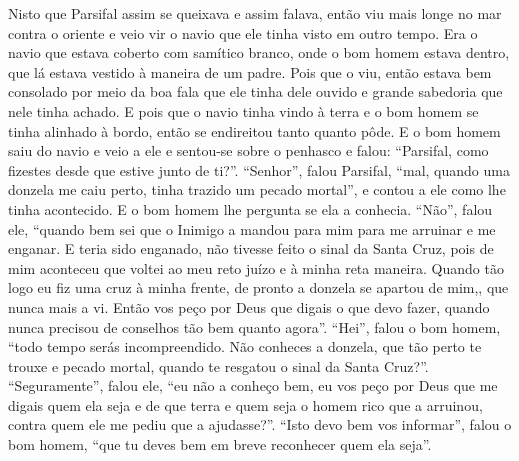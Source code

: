 Nisto que Parsifal assim se queixava e assim falava, então viu mais longe
no mar contra o oriente e veio vir o navio que ele tinha visto em outro tempo.
Era o navio que estava coberto com samítico branco, onde o bom homem estava
dentro, que lá estava vestido à maneira de um padre. Pois que o viu, então
estava bem consolado por meio da boa fala que ele tinha dele ouvido e grande
sabedoria que nele tinha achado. E pois que o navio tinha vindo à terra e o bom
homem se tinha alinhado à bordo, então se endireitou tanto quanto pôde. E o bom
homem saiu do navio e veio a ele e sentou-se sobre o penhasco e falou:
“Parsifal, como fizestes desde que estive junto de ti?”. “Senhor”, falou
Parsifal, “mal, quando uma donzela me caiu perto, tinha trazido um pecado
mortal”, e contou a ele como lhe tinha acontecido. E o bom homem lhe pergunta
se ela a conhecia. “Não”, falou ele, “quando bem sei que o Inimigo a mandou
para mim para me arruinar e me enganar. E teria sido enganado, não tivesse
feito o sinal da Santa Cruz, pois de mim aconteceu que voltei ao meu reto juízo
e à minha reta maneira. Quando tão logo eu fiz uma cruz à minha frente, de
pronto a donzela se apartou de mim,, que nunca mais a vi. Então vos peço por
Deus que digais o que devo fazer, quando nunca precisou de conselhos tão bem
quanto agora”. “Hei”, falou o bom homem, “todo tempo serás
incompreendido. Não conheces a donzela, que tão perto te trouxe e pecado
mortal, quando te resgatou o sinal da Santa Cruz?”. “Seguramente”, falou ele,
“eu não a conheço bem, eu vos peço por Deus que me digais quem ela seja e de
que terra e quem seja o homem rico que a arruinou, contra quem ele me pediu que
a ajudasse?”. “Isto devo bem vos informar”, falou o bom homem, “que tu
deves bem em breve reconhecer quem ela seja”.

